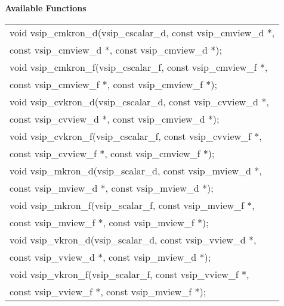 \\\cvsiplh
\\ \hspace*{.8cm} \vspace*{.1cm} \textbf{Available Functions }
\\ \hspace*{0.03\textwidth} {
\ttfamily
\begin{tabular}[H]{l}
void vsip\_cmkron\_d(vsip\_cscalar\_d, const vsip\_cmview\_d *,\\*\hspace{.6cm}const vsip\_cmview\_d *, const vsip\_cmview\_d *);\\
void vsip\_cmkron\_f(vsip\_cscalar\_f, const vsip\_cmview\_f *,\\*\hspace{.6cm}const vsip\_cmview\_f *, const vsip\_cmview\_f *);\\
void vsip\_cvkron\_d(vsip\_cscalar\_d, const vsip\_cvview\_d *,\\*\hspace{.6cm}const vsip\_cvview\_d *, const vsip\_cmview\_d *);\\
void vsip\_cvkron\_f(vsip\_cscalar\_f, const vsip\_cvview\_f *,\\*\hspace{.6cm}const vsip\_cvview\_f *, const vsip\_cmview\_f *);\\
void vsip\_mkron\_d(vsip\_scalar\_d, const vsip\_mview\_d *,\\*\hspace{.6cm}const vsip\_mview\_d *, const vsip\_mview\_d *);\\
void vsip\_mkron\_f(vsip\_scalar\_f, const vsip\_mview\_f *,\\*\hspace{.6cm}const vsip\_mview\_f *, const vsip\_mview\_f *);\\
void vsip\_vkron\_d(vsip\_scalar\_d, const vsip\_vview\_d *,\\*\hspace{.6cm}const vsip\_vview\_d *, const vsip\_mview\_d *);\\
void vsip\_vkron\_f(vsip\_scalar\_f, const vsip\_vview\_f *,\\*\hspace{.6cm}const vsip\_vview\_f *, const vsip\_mview\_f *);\\
\end{tabular}
}
\\\pyjvsiph
{}

